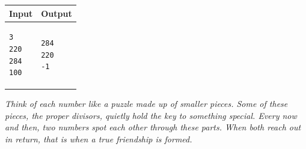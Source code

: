 \documentclass[12pt, a4paper]{article}
\begin{document}
\begin{table}[h]
\centering
\begin{tabular}{|p{}|p{}|}
\hline
\textbf{Input} & \textbf{Output} \\
\hline
\begin{verbatim}
3
220
284
100
\end{verbatim}
&
\begin{verbatim}
284
220
-1
\end{verbatim}
\\
\hline
\end{tabular}
\end{table}

\vspace{0.5cm}
\noindent \textit{Think of each number like a puzzle made up of smaller pieces. Some of these pieces, the proper divisors, quietly hold the key to something special. Every now and then, two numbers spot each other through these parts. When both reach out in return, that is when a true friendship is formed.}
\end{document}

